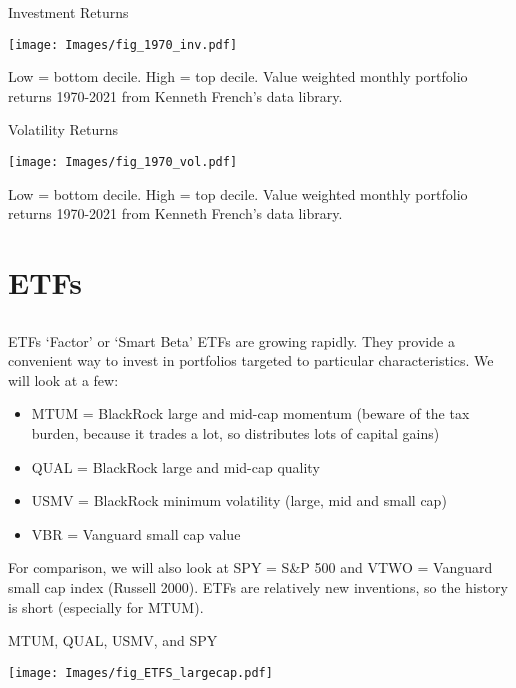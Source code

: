 \documentclass[xcolor=dvipsnames,10pt]{beamer}
\begin{document}
\begin{frame}{Investment Returns}
     \begin{center}
        \texttt{[image: Images/fig\_1970\_inv.pdf]}
    \end{center}
    Low = bottom decile.  High = top decile.  Value weighted monthly portfolio returns 1970-2021 from Kenneth French's data library.
\end{frame}

\begin{frame}{Volatility Returns}
     \begin{center}
        \texttt{[image: Images/fig\_1970\_vol.pdf]}
    \end{center}
    Low = bottom decile.  High = top decile.  Value weighted monthly portfolio returns 1970-2021 from Kenneth French's data library.
\end{frame}
\section{ETFs}\subsection{}

\begin{frame}{ETFs}
   `Factor' or `Smart Beta' ETFs are growing rapidly.  They provide a convenient way to invest in portfolios targeted to particular characteristics.  
   We will look at a few:
   \begin{itemize}
       \item MTUM = BlackRock large and mid-cap momentum (beware of the tax burden, because it trades a lot, so distributes lots of capital gains)
       \item QUAL = BlackRock large and mid-cap quality
       \item USMV = BlackRock minimum volatility (large, mid and small cap)
       \item VBR = Vanguard small cap value
   \end{itemize}
   For comparison, we will also look at SPY = S\&P 500 and VTWO = Vanguard small cap index (Russell 2000).
    ETFs are relatively new inventions, so the history is short (especially for MTUM).
\end{frame}


\begin{frame}{MTUM, QUAL, USMV, and SPY}
    \begin{center}
        \texttt{[image: Images/fig\_ETFS\_largecap.pdf]}
    \end{center}
\end{frame}
\end{document}
